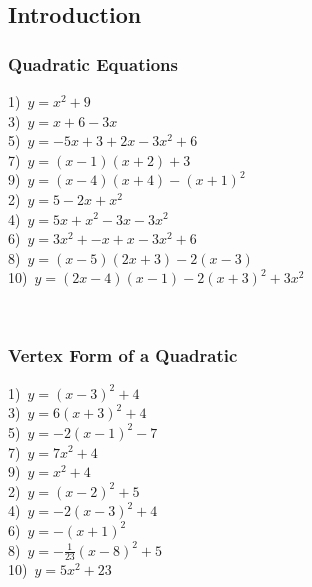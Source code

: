 \subsection{Introduction}

\subsubsection{Quadratic Equations}
 
{}

\begin{multicols}{2}
  1)~$y=x^2 + 9$\\
	3)~$y=x+6-3x$\\
	5)~$y=-5x+3+2x-3x^2+6$\\
  7)~$y=(x-1)(x+2)+3$\\
  9)~$y=(x-4)(x+4)-(x+1)^2$\\
	2)~$y=5-2x+x^2$\\
	4)~$y=5x+x^2-3x-3x^2$\\
  6)~$y=3x^2+-x+x-3x^2+6$\\
  8)~$y=(x-5)(2x+3)-2(x-3)$\\
  10)~$y=(2x-4)(x-1)-2(x+3)^2+3x^2$
\end{multicols}

~\\%

\subsubsection{Vertex Form of a Quadratic} 

{}

\begin{multicols}{2}
  1)~$y=(x-3)^2+4$\\
  3)~$y=6(x+3)^2+4$\\
  5)~$y=-2(x-1)^2-7$\\
  7)~$y=7x^2+4$\\
  9)~$y=x^2+4$\\
  2)~$y=(x-2)^2+5$\\
  4)~$y=-2(x-3)^2+4$\\
  6)~$y=-(x+1)^2$\\
  8)~$y=-\frac{1}{23}(x-8)^2+5$\\
  10)~$y=5x^2+23$
\end{multicols}

